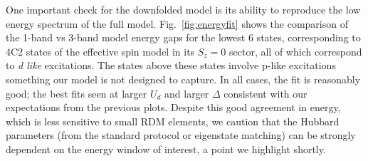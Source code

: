 One important check for the downfolded model is its ability to reproduce the low energy spectrum of 
the full model. Fig.~\ref{fig:energyfit} shows the comparison of the 1-band vs 3-band model energy gaps 
for the lowest 6 states, corresponding to 4C2 states of the effective spin model in its $S_z=0$ sector, 
all of which correspond to \textit{d like} excitations. The states above these states involve p-like excitations something 
our model is not designed to capture. In all cases, the fit is reasonably good; 
the best fits seen at larger $U_d$ and larger $\Delta$ consistent with our expectations 
from the previous plots. Despite this good agreement in energy, which is less sensitive to small RDM elements, 
we caution that the Hubbard parameters (from the standard protocol or eigenstate matching) 
can be strongly dependent on the energy window of interest, a point we highlight shortly. 
